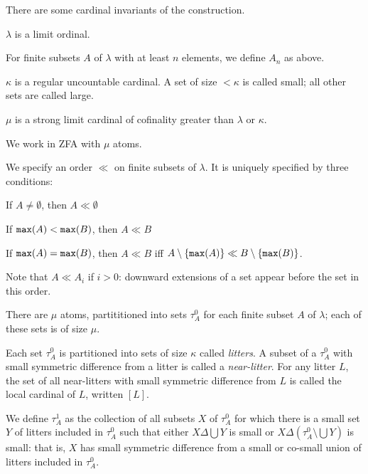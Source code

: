 \documentclass{slides}
\begin{document}
\begin{slide}

There are some cardinal invariants of the construction.

$\lambda$ is a limit ordinal.

For finite subsets $A$ of $\lambda$ with at least $n$ elements, we define $A_n$ as above.

$\kappa$ is a regular uncountable cardinal.  A set of size $<\kappa$ is called small;  all other sets are called large.

$\mu$ is a strong limit cardinal of cofinality greater than $\lambda$ or $\kappa$.

We work in ZFA with $\mu$ atoms.

\end{slide}

\begin{slide}

We specify an order $\ll$ on finite subsets of $\lambda$.    It is uniquely specified by three conditions:

\begin{description}

\item  If $A \neq \emptyset$, then $A \ll \emptyset$

\item  If ${\tt max}(A) < {\tt max}(B)$, then $A \ll B$

\item  If ${\tt max}(A) = {\tt max}(B)$, then $A \ll B$ iff $A \setminus \{{\tt max}(A)\} \ll B \setminus \{{\tt max}(B)\}$.

\end{description}

Note that $A \ll A_i$ if $i>0$:  downward extensions of a set appear before the set in this order.

\end{slide}

\begin{slide}

There are $\mu$ atoms, partititioned into sets $\tau^0_A$ for each finite subset $A$ of $\lambda$;  each of these sets is of size $\mu$.

Each set $\tau^0_A$ is partitioned into sets of size $\kappa$ called {\em litters\/}.  A subset of a $\tau^0_A$  with small symmetric difference from a litter is called a {\em near-litter\/}.  For any litter $L$, the set of all near-litters with small symmetric difference from $L$ is called the local cardinal of $L$, written $[L]$.

We define $\tau^1_A$ as the collection of all subsets $X$ of $\tau^0_A$ for which there is a small set $Y$  of litters included in $\tau^0_A$ such that either
$X \Delta \bigcup Y$ is small or $X \Delta (\tau^0_A \setminus \bigcup Y)$ is small:  that is, $X$ has small symmetric difference from a small or co-small union of litters
included in $\tau^0_A$.

\end{slide}
\end{document}
